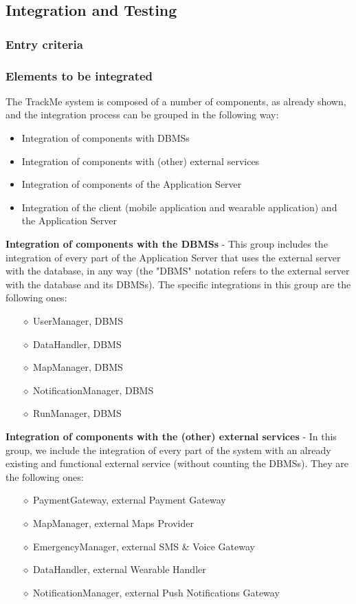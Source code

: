 \subsection{Integration and Testing}
\subsubsection{Entry criteria}

\subsubsection{Elements to be integrated}
The TrackMe system is composed of a number of components, as already shown, and the integration process can be grouped in the following way:
\begin{itemize}
\item Integration of components with DBMSs
\item Integration of components with (other) external services
\item Integration of components of the Application Server
\item Integration of the client (mobile application and wearable application) and the Application Server
\end{itemize}

\textbf{Integration of components with the DBMSs} - This group includes the integration of every part of the Application Server that uses the external server with the database, in any way (the "DBMS" notation refers to the external server with the database and its DBMSs). The specific integrations in this group are the following ones:
\begin{itemize}
\item[$\diamond$] UserManager, DBMS
\item[$\diamond$] DataHandler, DBMS
\item[$\diamond$] MapManager, DBMS
\item[$\diamond$] NotificationManager, DBMS
\item[$\diamond$] RunManager, DBMS
\end{itemize}

\textbf{Integration of components with the (other) external services} - In this group, we include the integration of every part of the system with an already existing and functional external service (without counting the DBMSs). They are the following ones:
\begin{itemize}
\item[$\diamond$] PaymentGateway, external Payment Gateway
\item[$\diamond$] MapManager, external Maps Provider
\item[$\diamond$] EmergencyManager, external SMS \& Voice Gateway
\item[$\diamond$] DataHandler, external Wearable Handler
\item[$\diamond$] NotificationManager, external Push Notifications Gateway
\end{itemize}

